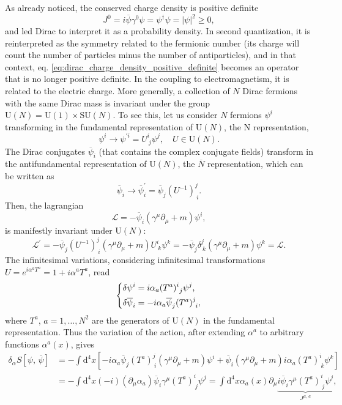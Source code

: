 As already noticed, the conserved charge density is positive definite
\begin{equation}
    J^0 = i \overline{\psi} \gamma^{0} \psi = \psi^{\dagger} \psi = \vert \psi \vert^2 \geq 0,
    \label{eq:dirac_charge_density_positive_definite}
\end{equation}
and led Dirac to interpret it as a probability density. In second quantization, it is reinterpreted as the symmetry related to the fermionic number (its charge will count the number of particles minus the number of antiparticles), and in that context, eq. \eqref{eq:dirac_charge_density_positive_definite} becomes an operator that is no longer positive definite. In the coupling to electromagnetism, it is related to the electric charge.
More generally, a collection of \(N\) Dirac fermions with the same Dirac mass is invariant under the group \(\mathrm{U}(N) = \mathrm{U}(1)\times \mathrm{SU}(N) \). To see this, let us consider \(N\) fermions \(\psi^i\) transforming in the fundamental representation of \(\mathrm{U}(N)\), the N representation,
\[
    \psi^i \to \psi^{\prime i} = U^i_{\ j} \psi^j, \quad U \in \mathrm{U}(N).
\]
The Dirac conjugates \(\overline{\psi}_i\) (that contains the complex conjugate fields) transform in the antifundamental representation of \(\mathrm{U}(N)\), the \(\overline{N}\) representation, which can be written as
\[
    \overline{\psi}_i \to \overline{\psi}_i^{\prime} = \overline{\psi}_j (U^{-1})^j_{\ i}.
\]
Then, the lagrangian
\[
    \mathcal{L} = - \overline{\psi}_i (\gamma^{\mu} \partial_\mu + m) \psi^i,
\]
is manifestly invariant under \(\mathrm{U}(N)\):
\[
    \mathcal{L}^{\prime} = - \overline{\psi}_j (U^{-1})^j_{\ i} (\gamma^{\mu} \partial_\mu + m) U^i_{\ k} \psi^k = - \overline{\psi}_j \delta^j_{\ k} (\gamma^{\mu} \partial_\mu + m) \psi^k = \mathcal{L}.
\]
The infinitesimal variations, considering infinitesimal transformations \(U = e^{i \alpha^a T^a} = 1 + i \alpha^a T^a\), read
\[
    \begin{dcases}
        \delta \psi^i = i \alpha_a (T^a)^i_{\ j} \psi^j, \\
        \delta \overline{\psi}_i = - i \alpha_a \overline{\psi}_j (T^a)^j_{\ i},
    \end{dcases}
\]
where \(T^a\), \(a=1, \ldots, N^2\) are the generators of \(\mathrm{U}(N)\) in the fundamental representation. Thus the variation of the action, after extending \(\alpha^a\) to arbitrary functions \(\alpha^a(x)\), gives
\[
    \begin{aligned}
        \delta_{\alpha} S[\psi,\,\overline{\psi}] & = - \int \mathrm{d}^4 x \left[ - i \alpha_a \overline{\psi}_j (T^a)^j_{\ i} (\gamma^{\mu} \partial_\mu + m) \psi^i + \overline{\psi}_i (\gamma^{\mu} \partial_\mu + m) i \alpha_a (T^a)^i_{\ k} \psi^k \right]                              \\
                                                  & = - \int \mathrm{d}^4 x (- i)(\partial_\mu \alpha_a) \overline{\psi}_i \gamma^{\mu} (T^a)^i_{\ j} \psi^j = \int \mathrm{d}^4 x \alpha_a(x) \partial_{\mu} \underbrace{i \overline{\psi}_i \gamma^{\mu} (T^a)^i_{\ j} \psi^j}_{J^{\mu,\,a}},
    \end{aligned}
\]

